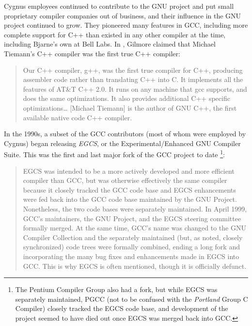 Cygnus employees continued to contribute to the GNU project and put small
proprietary compiler companies out of business, and their influence
in the GNU project continued to grow.
They pioneered many features in GCC, including more complete support for C++
than existed in any other compiler at the time, including Bjarne's own
at Bell Labs.
In \parencite{gilmore_tiemann_henkel_wallace_cygnus_history_2006}, Gilmore
claimed that Michael Tiemann's C++ compiler was the first true C++ compiler:

\begin{quotation}
	Our C++ compiler, g++, was the first true compiler for C++, producing assembler
	code rather than translating C++ into C. It implements all the features of AT\&T C++ 2.0.
	It runs on any machine that gcc supports, and does the same optimizations.
	It also provides additional C++ specific optimizations\dots
	[Michael Tiemann] is the author of GNU C++, the first available native code C++ compiler.
\end{quotation}

In the 1990s, a subset of the GCC contributors (most of whom were employed by Cygnus)
began releasing \textit{EGCS}, or the Experimental/Enhanced GNU Compiler Suite.
This was the first and last major fork of the GCC project to date
\footnote{The Pentium Compiler Group also had a fork, but while EGCS
	was separately maintained, PGCC (not to be confused with the \textit{Portland} Group C Compiler)
	closely tracked the EGCS code base, and development of the project seemed to have died
	out once EGCS was merged back into GCC.}:

\begin{quotation}
	EGCS was intended to be a more actively developed and more
	efficient compiler than GCC, but was otherwise effectively the same compiler because it closely
	tracked the GCC code base and EGCS enhancements were fed back into the GCC code base maintained
	by the GNU Project. Nonetheless, the two code bases were separately maintained. In April 1999, GCC’s
	maintainers, the GNU Project, and the EGCS steering committee formally merged. At the same time,
	GCC’s name was changed to the GNU Compiler Collection and the separately maintained (but, as
	noted, closely synchronized) code trees were formally combined, ending a long fork and
	incorporating the many bug fixes and enhancements made in EGCS into GCC. This is why EGCS is often
	mentioned, though it is officially defunct.
	\parencite{von_hagen_definitive_guide_gcc_2011}
\end{quotation}

